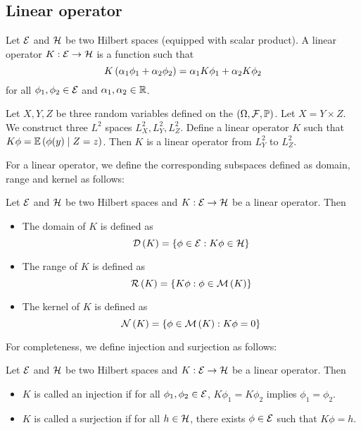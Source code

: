 \subsection{Linear operator}
\begin{definition}
    Let $\mathcal{E}$ and $\mathcal{H}$ be two Hilbert spaces (equipped with scalar product). A linear operator $K:\mathcal{E}\rightarrow\mathcal{H}$ is a function such that
    \begin{equation*}
        K\left(\alpha_1\phi_1+\alpha_2\phi_2\right)=\alpha_1K\phi_1+\alpha_2K\phi_2
    \end{equation*}
    for all $\phi_1,\phi_2\in\mathcal{E}$ and $\alpha_1,\alpha_2\in\mathbb{R}$.
\end{definition}
\begin{example}
    Let $X,Y,Z$ be three random variables defined on the $(\Omega, \mathcal{F}, \mathbb{P})$. Let $X=Y\times Z$. We construct three $L^2$ spaces $L_X^2,L_Y^2,L_Z^2$. Define a linear operator $K$ such that $K\phi= \mathbb{E}\left(\phi(y)\mid Z=z\right)$. Then $K$ is a linear operator from $L_Y^2$ to $L_Z^2$.
\end{example}
For a linear operator, we define the corresponding subspaces defined as domain, range and kernel as follows:
\begin{definition}
    Let $\mathcal{E}$ and $\mathcal{H}$ be two Hilbert spaces and $K:\mathcal{E}\rightarrow\mathcal{H}$ be a linear operator. Then
    \begin{itemize}
        \item The domain of $K$ is defined as
        \begin{equation*}
            \mathcal{D}\left(K\right)=\left\{\phi\in\mathcal{E}:K\phi\in\mathcal{H}\right\}
        \end{equation*}
        \item The range of $K$ is defined as
        \begin{equation*}
            \mathcal{R}\left(K\right)=\left\{K\phi:\phi\in\mathcal{M}\left(K\right)\right\}
        \end{equation*}
        \item The kernel of $K$ is defined as
        \begin{equation*}
            \mathcal{N}\left(K\right)=\left\{\phi\in\mathcal{M}\left(K\right):K\phi=0\right\}
        \end{equation*}
    \end{itemize}
\end{definition}

For completeness, we define injection and surjection as follows:
\begin{definition}
    Let $\mathcal{E}$ and $\mathcal{H}$ be two Hilbert spaces and $K:\mathcal{E}\rightarrow\mathcal{H}$ be a linear operator. Then
    \begin{itemize}
        \item $K$ is called an injection if for all $\phi_1,\phi_2\in\mathcal{E}$, $K\phi_1=K\phi_2$ implies $\phi_1=\phi_2$.
        \item $K$ is called a surjection if for all $h\in\mathcal{H}$, there exists $\phi\in\mathcal{E}$ such that $K\phi=h$.
    \end{itemize}
\end{definition}

